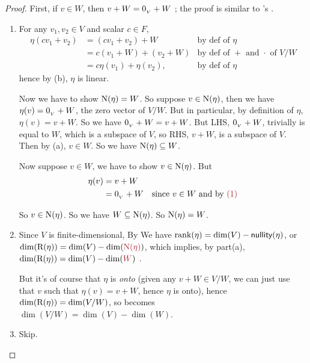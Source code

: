 \begin{proof}
First, if \(v \in W\), then \(v + W = 0_{_V} + W\) ;
the proof is similar to 's \RED{(*)}.
\begin{enumerate}
\item For any \(v_1, v_2 \in V\) and scalar \(c \in F\),
\begin{align*}
    \eta(c v_1 + v_2) & = (c v_1 + v_2) + W & \text{by def of \(\eta\)} \\
                      & = c(v_1 + W) + (v_2 + W) & \text{by def of \(+\) and \(\cdot\) of \(V/W\)} \\
                      & = c\eta(v_1) + \eta(v_2), & \text{by def of \(\eta\)}
\end{align*}
hence by (b), \(\eta\) is linear.

Now we have to show \(\mathrm{N}(\eta) = W\).
So suppose \(v \in \mathrm{N}(\eta)\), then we have \(\eta(v) = 0_{_V} + W\), the zero vector of \(V/W\).
But in particular, by definition of \(\eta\), \(\eta(v) = v + W\).
So we have \(0_{_V} + W = v + W\).
But LHS, \(0_{_V} + W\), trivially is equal to \(W\), which is a subspace of \(V\), so RHS, \(v + W\), is a subspace of \(V\).
Then by (a), \(v \in W\).
So we have \(\mathrm{N}(\eta) \subseteq W\).

Now suppose \(v \in W\), we have to show \(v \in \mathrm{N}(\eta)\).
But
\begin{align*}
    \eta(v) & = v + W \\
            & = \OV + W & \text{since \(v \in W\) and by \MAROON{(1)}}
\end{align*}

So \(v \in \mathrm{N}(\eta)\).
So we have \(W \subseteq \mathrm{N}(\eta)\).
So \(\mathrm{N}(\eta) = W\).

\item
Since \(V\) is finite-dimensional, By  We have \(\mathrm{rank}(\eta) = \dim(V) - \textsf{nullity}(\eta)\), or \(\dim(\RANGE(\eta)) = \dim(V) - \dim(\MAROON{\NULL(\eta)})\), which implies, by part(a), \(\dim(\RANGE(\eta)) = \dim(V) - \dim(\MAROON{W})\) .

But it's of course that \(\eta\) is \emph{onto} (given any \(v + W \in V/W\), we can just use that \(v\) such that \(\eta(v) = v + W\), hence \(\eta\) is onto),
hence \(\dim(\mathrm{R}(\eta)) = \dim(V/W)\), so  becomes \(\dim(V/W) = \dim(V) - \dim(W)\).

\item Skip.
\end{enumerate}
\end{proof}


